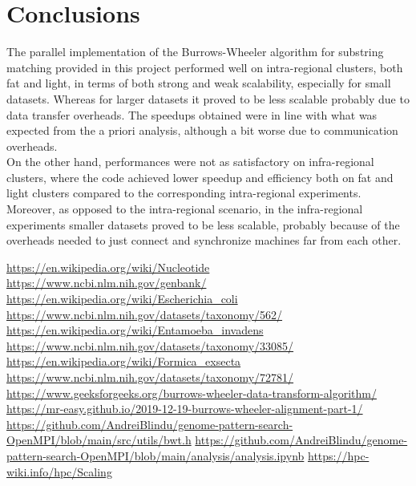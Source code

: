 \documentclass[final,5p,times,twocolumn,authoryear]{elsarticle}
\begin{document}
\section{Conclusions}
The parallel implementation of the Burrows-Wheeler algorithm for substring matching provided in this project performed well on intra-regional clusters, both fat and light, in terms of both strong and weak scalability, especially for small datasets. Whereas for larger datasets it proved to be less scalable probably due to data transfer overheads. The speedups obtained were in line with what was expected from the a priori analysis, although a bit worse due to communication overheads. \\
On the other hand, performances were not as satisfactory on infra-regional clusters, where the code achieved lower speedup and efficiency both on fat and light clusters compared to the corresponding intra-regional experiments. Moreover, as opposed to the intra-regional scenario, in the infra-regional experiments smaller datasets proved to be less scalable, probably because of the overheads needed to just connect and synchronize machines far from each other.


\begin{thebibliography}{9}
 \url{https://en.wikipedia.org/wiki/Nucleotide}
 \url{https://www.ncbi.nlm.nih.gov/genbank/}
 \url{https://en.wikipedia.org/wiki/Escherichia_coli}
 \url{https://www.ncbi.nlm.nih.gov/datasets/taxonomy/562/}
 \url{https://en.wikipedia.org/wiki/Entamoeba_invadens}
 \url{https://www.ncbi.nlm.nih.gov/datasets/taxonomy/33085/}
 \url{https://en.wikipedia.org/wiki/Formica_exsecta}
 \url{https://www.ncbi.nlm.nih.gov/datasets/taxonomy/72781/}
\url{https://www.geeksforgeeks.org/burrows-wheeler-data-transform-algorithm/}
\url{https://mr-easy.github.io/2019-12-19-burrows-wheeler-alignment-part-1/}
\url{https://github.com/AndreiBlindu/genome-pattern-search-OpenMPI/blob/main/src/utils/bwt.h}
\url{https://github.com/AndreiBlindu/genome-pattern-search-OpenMPI/blob/main/analysis/analysis.ipynb}
\url{https://hpc-wiki.info/hpc/Scaling}
\end{thebibliography}
\end{document}
